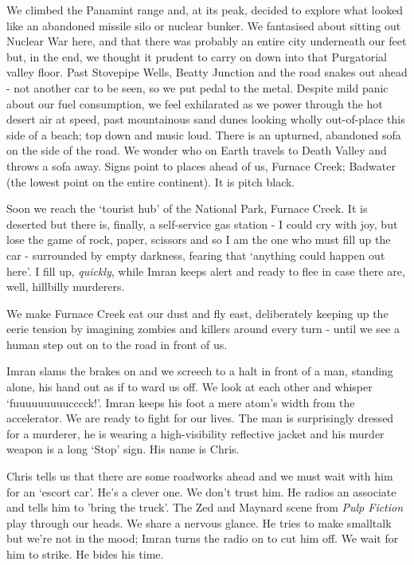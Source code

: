\documentclass[a5paper,10pt,titlepage,draft]{book}
\begin{document}
We climbed the Panamint range and, at its peak, decided to explore what looked like an abandoned missile silo or nuclear bunker.  We fantasised about sitting out Nuclear War here, and that there was probably an entire city underneath our feet but, in the end, we thought it prudent to carry on down into that Purgatorial valley floor.  Past Stovepipe Wells, Beatty Junction and the road snakes out ahead - not another car to be seen, so we put pedal to the metal.  Despite mild panic about our fuel consumption, we feel exhilarated as we power through the hot desert air at speed, past mountainous sand dunes looking wholly out-of-place this side of a beach; top down and music loud.  There is an upturned, abandoned sofa on the side of the road.  We wonder who on Earth travels to Death Valley and throws a sofa away.  Signs point to places ahead of us, Furnace Creek; Badwater (the lowest point on the entire continent).  It is pitch black.

Soon we reach the `tourist hub' of the National Park, Furnace Creek.  It is deserted but there is, finally, a self-service gas station - I could cry with joy, but lose the game of rock, paper, scissors and so I am the one who must fill up the car - surrounded by empty darkness, fearing that `anything could happen out here'.  I fill up, \emph{quickly}, while Imran keeps alert and ready to flee in case there are, well, hillbilly murderers.

We make Furnace Creek eat our dust and fly east, deliberately keeping up the eerie tension by imagining zombies and killers around every turn - until we see a human step out on to the road in front of us.

Imran slams the brakes on and we screech to a halt in front of a man, standing alone, his hand out as if to ward us off.  We look at each other and whisper `fuuuuuuuuucccck!'.  Imran keeps his foot a mere atom's width from the accelerator.  We are ready to fight for our lives.  The man is surprisingly dressed for a murderer, he is wearing a high-visibility reflective jacket and his murder weapon is a long `Stop' sign.  His name is Chris.

Chris tells us that there are some roadworks ahead and we must wait with him for an `escort car'.  He's a clever one.  We don't trust him.  He radios an associate and tells him to 'bring the truck'.  The Zed and Maynard scene from \emph{Pulp Fiction} play through our heads.  We share a nervous glance.  He tries to make smalltalk but we're not in the mood; Imran turns the radio on to cut him off.  We wait for him to strike.  He bides his time.
\end{document}

